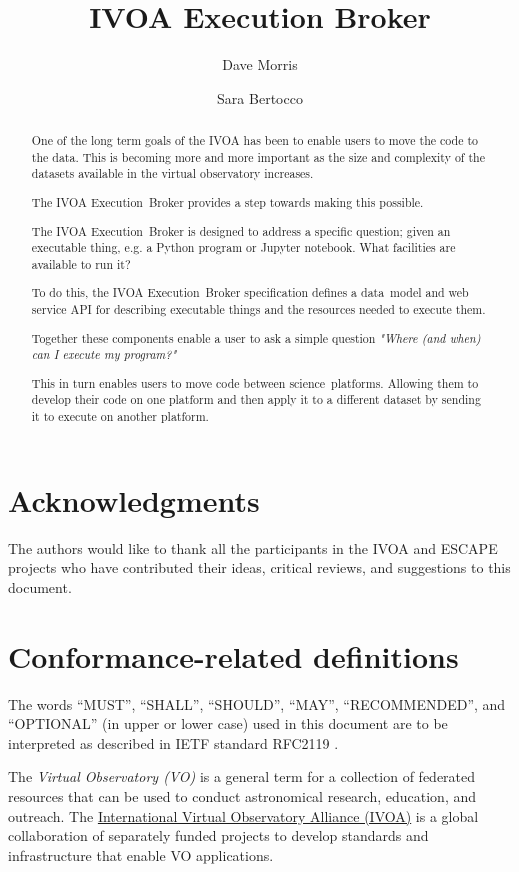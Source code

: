 \documentclass[11pt,a4paper]{ivoa}
\title{IVOA Execution Broker}
\author[http://www.ivoa.net/twiki/bin/view/IVOA/DaveMorris]
       {Dave Morris}
\author[http://www.ivoa.net/twiki/bin/view/IVOA/SaraBertocco]
       {Sara Bertocco}
\newcommand{\datamodel} {data~model}
\newcommand{\webservice} {web service}
\newcommand{\ivoa} {IVOA}
\newcommand{\executionbroker} {Execution~Broker}
\newcommand{\jupyternotebook} {Jupyter notebook}
\newcommand{\pythonprogram} {Python program}
\newcommand{\footurl}[1] {\footnote{\url{#1}}}
\newcommand{\dataset}[1] {dataset#1}
\newcommand{\scienceplatform}[1] {science~platform#1}
\begin{document}
\begin{abstract}
\label{abstract}

One of the long term goals of the IVOA has been to enable users to
move the code to the data.
This is becoming more and more important as the size and complexity
of the \dataset{s} available in the virtual observatory increases.

The \ivoa{} \executionbroker{} provides a step towards making this possible.

The \ivoa{} \executionbroker{} is designed to address a specific question;
given an executable thing, e.g. a \pythonprogram{} or \jupyternotebook{}.
What facilities are available to run it?

To do this, the \ivoa{} \executionbroker{} specification defines
a \datamodel{} and \webservice{} API for describing executable things
and the resources needed to execute them.

Together these components enable a user to ask a simple question
\textit{"Where (and when) can I execute my program?"}

This in turn enables users to move code between \scienceplatform{s}.
Allowing them to develop their code on one platform and then apply it to a different
\dataset{} by sending it to execute on another platform.

\end{abstract}

\section*{Acknowledgments}
\label{acknowledgments}

The authors would like to thank all the participants in the IVOA and ESCAPE projects
who have contributed their ideas, critical reviews, and suggestions to this document.

\section*{Conformance-related definitions}

The words ``MUST'', ``SHALL'', ``SHOULD'', ``MAY'', ``RECOMMENDED'', and
``OPTIONAL'' (in upper or lower case) used in this document are to be
interpreted as described in IETF standard RFC2119 \citep{std:RFC2119}.

The \emph{Virtual Observatory (VO)} is a general term for a collection of
federated resources that can be used to conduct astronomical research,
education, and outreach.
The \href{https://www.ivoa.net}{International Virtual Observatory Alliance (IVOA)}
is a global collaboration of separately funded projects to develop standards and
infrastructure that enable VO applications.
\end{document}

